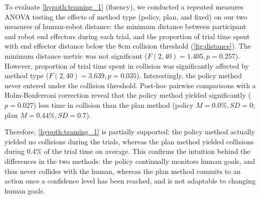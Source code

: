 To evaluate \cref{hypoth:teaming_1} (fluency), we conducted a repeated measures ANOVA testing the effects of method type (policy, plan, and fixed) on our two measures of human-robot distance: the minimum distance between participant and robot end effectors during each trial, and the proportion of trial time spent with end effector distance below the 8cm collision threshold (\cref{fig:distance}). The minimum distance metric was not significant ($F(2,40) = 1.405, p = 0.257$). However, proportion of trial time spent in collision was significantly affected by method type ($F(2,40) = 3.639, p = 0.035$). Interestingly, the policy method never entered under the collision threshold. Post-hoc pairwise comparisons with a Holm-Bonferroni correction reveal that the policy method yielded significantly ($p = 0.027$) less time in collision than the plan method (policy $M=0.0\%, SD=0$; plan $M=0.44\%, SD = 0.7$). 

Therefore, \cref{hypoth:teaming_1} is partially supported: the policy method actually yielded no collisions during the trials, whereas the plan method yielded collisions during 0.4\% of the trial time on average. This confirms the intuition behind the differences in the two methods: the policy continually monitors human goals, and thus never collides with the human, whereas the plan method commits to an action once a confidence level has been reached, and is not adaptable to changing human goals.

